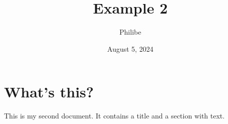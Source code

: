 \documentclass[a4paper, 11pt]{article}
\title{Example 2}
\author{Philibe}
\date{August 5, 2024}
\begin{document}
\maketitle
\section{What's this?}
This is my second document. It contains a title and a section with text.
\end{document}
